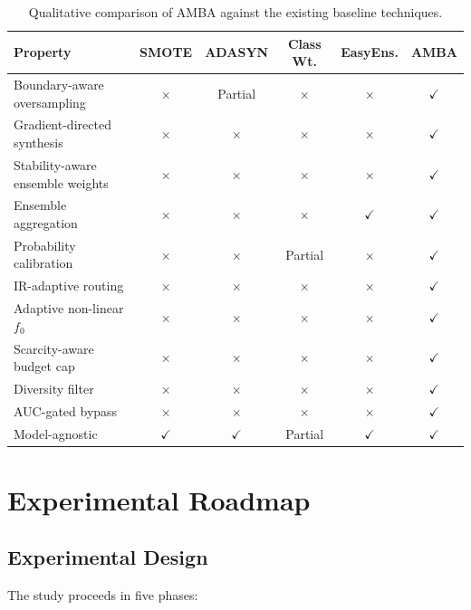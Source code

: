 \documentclass[11pt,a4paper]{article}
\begin{document}
\begin{table}[ht]
\centering
\caption{Qualitative comparison of AMBA against the existing baseline techniques.}
\begin{tabular}{lccccc}
\toprule
\textbf{Property} & \textbf{SMOTE} & \textbf{ADASYN} & \textbf{Class Wt.} & \textbf{EasyEns.} & \textbf{AMBA} \\
\midrule
Boundary-aware oversampling     & $\times$ & Partial  & $\times$ & $\times$ & $\checkmark$ \\
Gradient-directed synthesis     & $\times$ & $\times$ & $\times$ & $\times$ & $\checkmark$ \\
Stability-aware ensemble weights& $\times$ & $\times$ & $\times$ & $\times$ & $\checkmark$ \\
Ensemble aggregation            & $\times$ & $\times$ & $\times$ & $\checkmark$ & $\checkmark$ \\
Probability calibration         & $\times$ & $\times$ & Partial  & $\times$ & $\checkmark$ \\
IR-adaptive routing             & $\times$ & $\times$ & $\times$ & $\times$ & $\checkmark$ \\
Adaptive non-linear $f_0$       & $\times$ & $\times$ & $\times$ & $\times$ & $\checkmark$ \\
Scarcity-aware budget cap       & $\times$ & $\times$ & $\times$ & $\times$ & $\checkmark$ \\
Diversity filter                & $\times$ & $\times$ & $\times$ & $\times$ & $\checkmark$ \\
AUC-gated bypass                & $\times$ & $\times$ & $\times$ & $\times$ & $\checkmark$ \\
Model-agnostic                  & $\checkmark$ & $\checkmark$ & Partial & $\checkmark$ & $\checkmark$ \\
\bottomrule
\end{tabular}
\end{table}

\section{Experimental Roadmap}

\subsection{Experimental Design}

The study proceeds in five phases:
\end{document}
